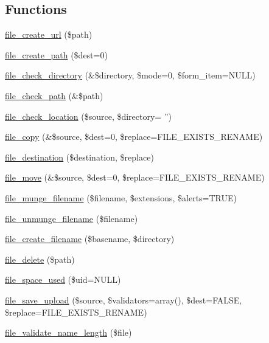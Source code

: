 \subsection*{Functions}
\begin{CompactItemize}
\item 
\hyperlink{group__file_g1a305a4da1e6e5c6b1783ceffb66c340}{file\_\-create\_\-url} (\$path)
\item 
\hyperlink{group__file_g306337da81ebf20aa858167c0ca5a979}{file\_\-create\_\-path} (\$dest=0)
\item 
\hyperlink{group__file_g1cae9f6fea37182a71710f0209d586dd}{file\_\-check\_\-directory} (\&\$directory, \$mode=0, \$form\_\-item=NULL)
\item 
\hyperlink{group__file_gf6eee3f0c0c8bc7ebca388ed3032ba66}{file\_\-check\_\-path} (\&\$path)
\item 
\hyperlink{group__file_g1cdeffc5a199d73e83e1e1d27753f619}{file\_\-check\_\-location} (\$source, \$directory= '')
\item 
\hyperlink{group__file_g7b8986808579dfb242787b60c8b9838a}{file\_\-copy} (\&\$source, \$dest=0, \$replace=FILE\_\-EXISTS\_\-RENAME)
\item 
\hyperlink{group__file_g3136d98d6189607e6cba12aaff55c66d}{file\_\-destination} (\$destination, \$replace)
\item 
\hyperlink{group__file_gd1dc7d1fd2d90de77d53d4fb90fb16b3}{file\_\-move} (\&\$source, \$dest=0, \$replace=FILE\_\-EXISTS\_\-RENAME)
\item 
\hyperlink{group__file_ge5f97959982c78dfde2f806757c21368}{file\_\-munge\_\-filename} (\$filename, \$extensions, \$alerts=TRUE)
\item 
\hyperlink{group__file_gbda71018b91068bcd9fcd527a0493347}{file\_\-unmunge\_\-filename} (\$filename)
\item 
\hyperlink{group__file_g057bbfa5f89c4e4c75f0030e6f1f3809}{file\_\-create\_\-filename} (\$basename, \$directory)
\item 
\hyperlink{group__file_g58d648a7a057d1e014727c7958935af6}{file\_\-delete} (\$path)
\item 
\hyperlink{group__file_g1cffb160754bb1704ab2c773a7c1ffb4}{file\_\-space\_\-used} (\$uid=NULL)
\item 
\hyperlink{group__file_gfb10e016dd068cbc5915619f7ca9bf2c}{file\_\-save\_\-upload} (\$source, \$validators=array(), \$dest=FALSE, \$replace=FILE\_\-EXISTS\_\-RENAME)
\item 
\hyperlink{group__file_ga70aadd824b8e9b654597c4fb6b6c70a}{file\_\-validate\_\-name\_\-length} (\$file)

\end{CompactItemize}
